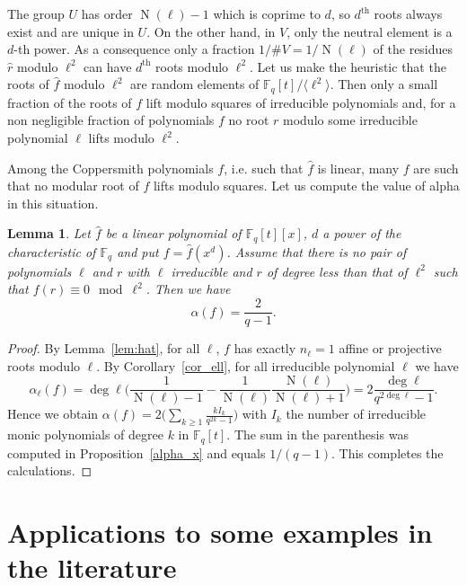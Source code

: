 \documentclass[a4wide]{article}
\newcommand{\F}{{\mathbb F}}
\DeclareMathOperator{\Norm}{N}
\theoremstyle{plain}
\newtheorem{lem}[theo]{Lemma}
\theoremstyle{definition}
\theoremstyle{remark}
\begin{document}
The group $U$ has order $\Norm(\ell)-1$ which is coprime to $d$, so
$d^\text{th}$ roots always exist and are unique in $U$. On the other hand, in
$V$, only the neutral element is a $d$-th power.
As a consequence only a fraction $1/\#V=1/\Norm(\ell)$ of the residues $\hat{r}$
modulo $\ell^2$ can have $d^\text{th}$ roots modulo $\ell^2$. Let us make
the heuristic that the roots of $\hat{f}$ modulo $\ell^2$ are random elements
of $\F_q[t]/\langle \ell^2\rangle$. Then only a small fraction of the roots
of $f$ lift modulo squares of irreducible polynomials and, for a non
negligible fraction of polynomials $f$ no root $r$ modulo some irreducible
polynomial $\ell$ lifts modulo $\ell^2$.  

Among the Coppersmith polynomials $f$, i.e. such that $\hat{f}$ is
linear, many $f$ are such that no modular root of $f$ lifts modulo squares.
Let us compute the value of alpha in this situation.
\begin{lem}
	Let $\hat{f}$ be a linear polynomial of $\F_q[t][x]$, $d$ a power
	of the characteristic of $\F_q$ and put $f=\hat{f}(x^d)$. Assume
	that there is no pair of polynomials $\ell$ and $r$ with $\ell$
	irreducible and $r$ of degree less than that of
	$\ell^2$ such that $f(r)\equiv0\mod\ell^2$. Then we have
	$$\alpha(f)=\frac{2}{q-1}.$$
\end{lem}
\begin{proof}
	By Lemma~\ref{lem:hat}, for all $\ell$, $f$ has exactly $n_\ell=1$ affine
	or projective roots modulo $\ell$. 
	By Corollary~\ref{cor_ell}, for all irreducible polynomial
	$\ell$ we have
	\begin{equation*}
		\alpha_\ell(f)=\deg\ell\bigg(\frac{1}{\Norm(\ell)-1}-\frac{1}{\Norm(\ell)}\frac{\Norm(\ell)}{\Norm(\ell)+1}\bigg)=2\frac{\deg\ell}{q^{2\deg\ell}-1}.
\end{equation*}
Hence we obtain $\alpha(f)=2 \bigg(\sum_{k\geq 1}\frac{kI_k}{q^{2k}-1}\bigg)$ with $I_k$
the number of irreducible monic polynomials of degree $k$ in $\F_q[t]$. The
sum in the parenthesis was computed in Proposition~\ref{alpha_x} and equals
$1/(q-1)$. This completes the calculations.

\end{proof}
\section{Applications to some examples in the literature}\label{sec:examples}
\end{document}
